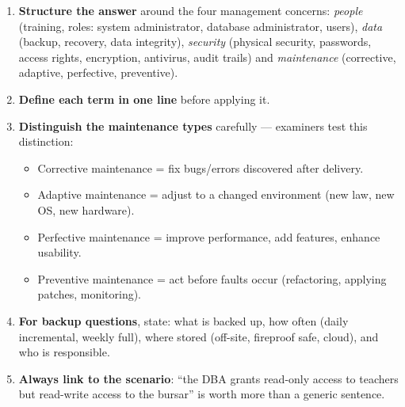 \documentclass[11pt]{article}
\newcommand{\cle}[1]{{\popxbold\color{popdark}#1}}
\begin{document}
\begin{methode}
\begin{enumerate}
\item \textbf{Structure the answer} around the four management concerns: \emph{people} (training, roles: system administrator, database administrator, users), \emph{data} (backup, recovery, data integrity), \emph{security} (physical security, passwords, access rights, encryption, antivirus, audit trails) and \emph{maintenance} (corrective, adaptive, perfective, preventive).
\item \textbf{Define each term in one line} before applying it.
\item \textbf{Distinguish the maintenance types} carefully — examiners test this distinction:
\begin{itemize}
\item \cle{Corrective maintenance} = fix bugs/errors discovered after delivery.
\item \cle{Adaptive maintenance} = adjust to a changed environment (new law, new OS, new hardware).
\item \cle{Perfective maintenance} = improve performance, add features, enhance usability.
\item \cle{Preventive maintenance} = act before faults occur (refactoring, applying patches, monitoring).
\end{itemize}
\item \textbf{For backup questions}, state: what is backed up, how often (daily incremental, weekly full), where stored (off-site, fireproof safe, cloud), and who is responsible.
\item \textbf{Always link to the scenario}: ``the DBA grants read-only access to teachers but read-write access to the bursar'' is worth more than a generic sentence.
\end{enumerate}
\end{methode}
\end{document}
